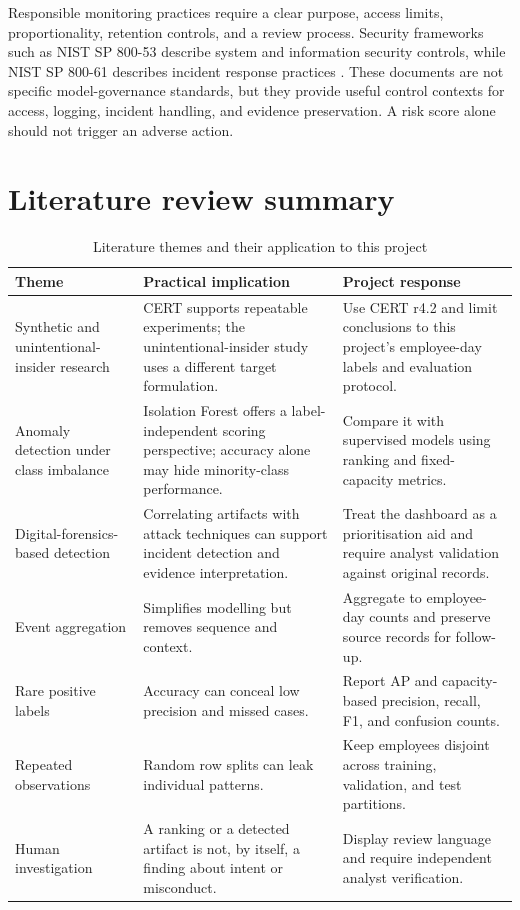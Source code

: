 \documentclass[12pt,a4paper,oneside]{report}
\newcommand{\tablefont}{\small}
\begin{document}
Responsible monitoring practices require a clear purpose, access
limits, proportionality, retention controls, and a review process.
Security frameworks such as NIST SP 800-53 describe system and
information security controls, while NIST SP 800-61 describes incident
response practices \cite{nist53,nist61}. These documents are not
specific model-governance standards, but they provide useful control
contexts for access, logging, incident handling, and evidence
preservation. A risk score alone should not trigger an adverse action.

\section{Literature review summary}
\begin{table}[H]
\centering
\tablefont
\caption{Literature themes and their application to this project}
\label{tab:literature-themes}
\begin{tabularx}{\textwidth}{|p{}|p{}|Y|}
\hline
\textbf{Theme} & \textbf{Practical implication} & \textbf{Project response}\\\hline
Synthetic and unintentional-insider research & CERT supports repeatable experiments; the unintentional-insider study uses a different target formulation. & Use CERT r4.2 and limit conclusions to this project's employee-day labels and evaluation protocol.\\\hline
Anomaly detection under class imbalance & Isolation Forest offers a label-independent scoring perspective; accuracy alone may hide minority-class performance. & Compare it with supervised models using ranking and fixed-capacity metrics.\\\hline
Digital-forensics-based detection & Correlating artifacts with attack techniques can support incident detection and evidence interpretation. & Treat the dashboard as a prioritisation aid and require analyst validation against original records.\\\hline
Event aggregation & Simplifies modelling but removes sequence and context. & Aggregate to employee-day counts and preserve source records for follow-up.\\\hline
Rare positive labels & Accuracy can conceal low precision and missed cases. & Report AP and capacity-based precision, recall, F1, and confusion counts.\\\hline
Repeated observations & Random row splits can leak individual patterns. & Keep employees disjoint across training, validation, and test partitions.\\\hline
Human investigation & A ranking or a detected artifact is not, by itself, a finding about intent or misconduct. & Display review language and require independent analyst verification.\\\hline
\end{tabularx}
\end{table}
\end{document}
